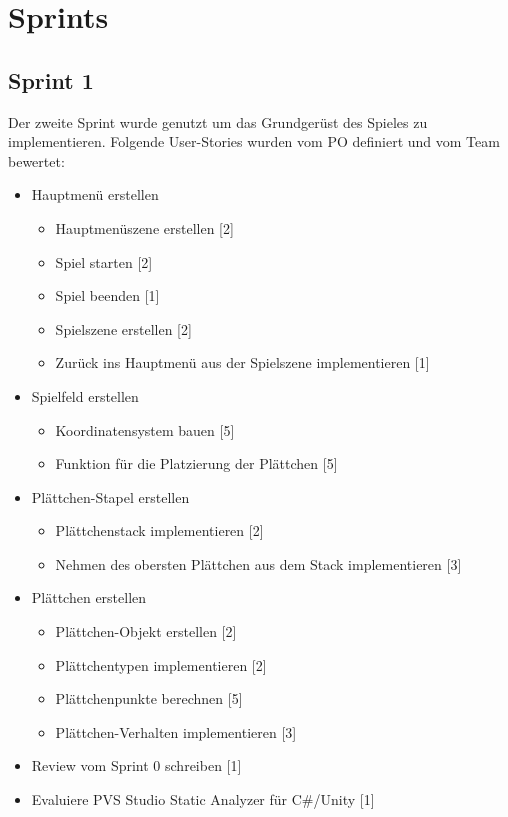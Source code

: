 \documentclass[../main.tex]{subfiles}
\begin{document}
	\section{Sprints}
	\label{section:Sprint 1}
	\subsection{Sprint 1}
	
	\par Der zweite Sprint wurde genutzt um das Grundgerüst des Spieles zu implementieren. Folgende User-Stories wurden vom PO definiert und vom Team bewertet:
	
	\begin{itemize}
		\item Hauptmenü erstellen
		\begin{itemize}
			\item Hauptmenüszene erstellen [2]
			\item Spiel starten [2]
			\item Spiel beenden [1]
			\item Spielszene erstellen [2]
			\item Zurück ins Hauptmenü aus der Spielszene implementieren [1]
		\end{itemize}
		\item Spielfeld erstellen
		\begin{itemize}
			\item Koordinatensystem bauen [5]
			\item Funktion für die Platzierung der Plättchen [5]
		\end{itemize}
		\item Plättchen-Stapel erstellen
		\begin{itemize}
			\item Plättchenstack implementieren [2]
			\item Nehmen des obersten Plättchen aus dem Stack implementieren [3]
		\end{itemize}
		\item Plättchen erstellen
		\begin{itemize}
			\item Plättchen-Objekt erstellen [2]
			\item Plättchentypen implementieren [2]
			\item Plättchenpunkte berechnen [5]
			\item Plättchen-Verhalten implementieren [3]
		\end{itemize}
		\item Review vom Sprint 0 schreiben [1]
		\item Evaluiere PVS Studio Static Analyzer für C\#/Unity [1]
	\end{itemize} 
\end{document}
